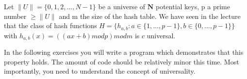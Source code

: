 Let $\|U\| = \lbrace 0,1,2,\dots,N-1 \rbrace$ be a universe of $\mathbf{N}$
potential keys, p a prime number $\geq \|U\|$ and m the size of the hash table.
We have seen in the lecture that the class of hash functions
\begin{math}
  H = \lbrace h_{a,b}: a \in \lbrace 1, \dots, p-1 \rbrace,
    b \in \lbrace 0, \dots, p-1 \rbrace\rbrace
\end{math}
with $h_{a,b}(x) = ((ax + b) mod p) mod m$ is $c$ universal.

In the following exercises you will write a program which demonstrates that
this property holds. The amount of code should be relatively minor this time.
Most importantly, you need to understand the concept of universality.